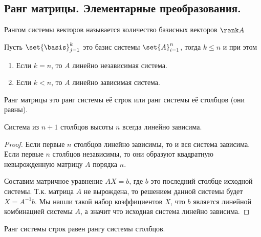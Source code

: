 \subsection{%
  Ранг матрицы. Элементарные преобразования.%
}

\begin{definition}
  Рангом системы векторов называется количество базисных векторов \(\rank A\)
\end{definition}

\begin{remark}
  Пусть \(\set{\basis}_{j = 1}^k\) это базис системы \(\set{A}_{i = 1}^n\),
  тогда \(k \le n\) и при этом
  
  \begin{enumerate}
  \item
    Если \(k = n\), то \(A\) линейно независимая система.
    
  \item
    Если \(k < n\), то \(A\) линейно зависимая система.
  \end{enumerate}
\end{remark}

\begin{definition}
  Ранг матрицы это ранг системы её строк или ранг системы её столбцов (они
  равны).
\end{definition}

\begin{lemma} \label{lem:n-plus-one}
   Система из \(n + 1\) столбцов высоты \(n\) всегда линейно зависима.
\end{lemma}

\begin{proof}
  Если первые \(n\) столбцов линейно зависимы, то и вся система зависима. Если
  первые \(n\) столбцов независимы, то они образуют квадратную невырожденную
  матрицу \(A\) порядка \(n\).
  
  Составим матричное уравнение \(AX = b\), где \(b\) это последний столбце
  исходной системы. Т.к. матрица \(A\) не вырождена, то решением данной системы
  будет \(X = A^{-1} b\). Мы нашли такой набор коэффициентов \(X\), что \(b\)
  является линейной комбинацией системы \(A\), а значит что исходная система
  линейно зависима.
\end{proof}

\begin{theorem}
  Ранг системы строк равен рангу системы столбцов.
\end{theorem}

